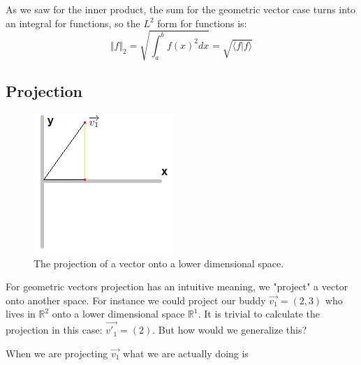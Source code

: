 \documentclass[letterpaper,12pt]{article}
\newcommand{\be}{\begin{equation}}
\newcommand{\ee}{\end{equation}}
\begin{document}
As we saw for the inner product, the sum for the geometric vector case turns into an integral for functions, so the $L^2$ form for functions is:
\be \Vert f \Vert_2 = \sqrt{\int_a^b f(x)^2 dx} = \sqrt{\langle f | f \rangle} \ee
\subsection{Projection}
\begin{figure}
\centering
\includegraphics{Proj.PNG}
\caption{\label{fig:Proj}The projection of a vector onto a lower dimensional space.}
\end{figure}

For geometric vectors projection has an intuitive meaning, we "project" a vector onto another space. For instance we could project our buddy $\overrightarrow{v_1}=(2,3)$ who lives in  $\mathbb{R}^2$ onto a lower dimensional space  $\mathbb{R}^1$. It is trivial to calculate the projection in this case: $\overrightarrow{v'_1}=(2)$. But how would we generalize this?

When we are projecting $\overrightarrow{v_1}$ what we are actually doing is 
\end{document}
